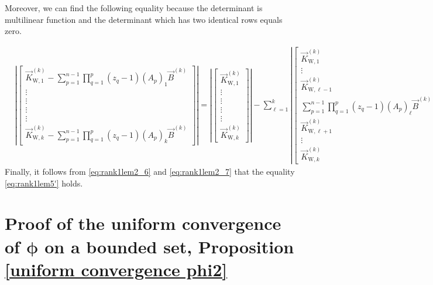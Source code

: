 \documentclass[cmp]{svjour}
\numberwithin{theorem}{section}
\numberwithin{equation}{section}
\begin{document}
Moreover, we can find the following equality because the determinant is multilinear function and the determinant which has two identical rows equals zero.

\begin{equation}
\label{eq:rank1lem2_7}
\begin{split}
& \left|
\left[
\begin{array}{c}
\vec{K}^{(k)}_{\mathrm{W}, 1} - \sum_{p=1}^{n-1}{ \prod_{q=1}^{p}{ (z_q - 1) {(A_p)}_1 } } \vec{B}^{(k)}  \\
\vdots \\
\vdots \\
\vdots \\
\vdots \\
\vec{K}^{(k)}_{\mathrm{W}, k} - \sum_{p=1}^{n-1}{ \prod_{q=1}^{p}{ (z_q - 1) {(A_p)}_k } } \vec{B}^{(k)}  
\end{array}
\right]
\right| 
=  \left|
\left[
\begin{array}{c}
\vec{K}^{(k)}_{\mathrm{W}, 1} \\
\vdots \\
\vdots \\
\vdots \\
\vdots \\
\vec{K}^{(k)}_{\mathrm{W}, k} 
\end{array}
\right]
\right| - \sum_{\ell=1}^{k}{ \left| \left[
\begin{array}{c}
\vec{K}^{(k)}_{\mathrm{W}, 1}  \\
\vdots \\
\vec{K}^{(k)}_{\mathrm{W}, \ell-1}  \\
\sum_{p=1}^{n-1}{ \prod_{q=1}^{p}{ (z_q - 1) {(A_p)}_\ell } } \vec{B}^{(k)} \\
 \vec{K}^{(k)}_{\mathrm{W}, \ell+1}  \\
 \vdots  \\
\vec{K}^{(k)}_{\mathrm{W}, k} 
\end{array}
\right]
\right| }
\end{split}
\end{equation}
Finally, it follows from \eqref{eq:rank1lem2_6} and \eqref{eq:rank1lem2_7} that the equality \eqref{eq:rank1lem5'} holds.

\section{Proof of the uniform convergence of $\boldsymbol{\phi}$ on a bounded set, Proposition \ref{uniform convergence phi2}}
\label{ap:uniform convergence phi2}
\end{document}
